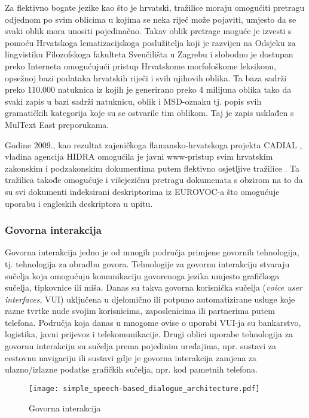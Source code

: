 \begin{multicols}{2}
Za flektivno bogate jezike kao što je hrvatski, tražilice moraju omogućiti pretragu odjednom po svim oblicima u kojima se neka riječ može pojaviti, umjesto da se svaki oblik mora unositi pojedinačno. Takav oblik pretrage moguće je izvesti s pomoću Hrvatskoga lematizacijskoga poslužitelja koji je razvijen na Odsjeku za lingvistiku Filozofskoga fakulteta Sveučilišta u Zagrebu i slobodno je dostupan preko Interneta \cite{str16} omogućujući pristup Hrvatskome morfološkome leksikonu, opsežnoj bazi podataka hrvatskih riječi i svih njihovih oblika. Ta baza sadrži preko 110.000 natuknica iz kojih je generirano preko 4 milijuna oblika tako da svaki zapis u bazi sadrži natuknicu, oblik i MSD-oznaku tj. popis svih gramatičkih kategorija koje su se ostvarile tim oblikom. Taj je zapis usklađen s MulText East \cite{str17} preporukama.

Godine 2009., kao rezultat zajeničkoga flamansko-hrvatskoga projekta CADIAL \cite{str18}, vladina agencija HIDRA omogućila je javni www-pristup svim hrvatskim zakonskim i podzakonskim dokumentima putem flektivno osjetljive tražilice \cite{str19}. Ta tražilica takođe omogućuje i višejezičnu pretragu dokumenata s obzirom na to da su svi dokumenti indeksirani deskriptorima iz EUROVOC-a što omogućuje uporabu i engleskih deskriptora u upitu.

  
\subsubsection{Govorna interakcija}

Govorna interakcija jedno je od mnogih područja primjene govornih tehnologija, tj. tehnologija za obradbu govora. Tehnologije za govornu interakciju stvaraju sučelja koja omogućuju komunikaciju govorenoga jezika umjesto grafičkoga sučelja, tipkovnice ili miša. Danas su takva govorna korisnička sučelja (\emph{voice user interfaces}, VUI) uključena u djelomično ili potpuno automatizirane usluge koje razne tvrtke nude svojim korisnicima, zaposlenicima ili partnerima putem telefona. Područja koja danas u mnogome ovise o uporabi VUI-ja su bankarstvo, logistika, javni prijevoz i telekomunikacije. Drugi oblici uporabe tehnologija za govornu interakciju su sučelja prema pojedinim uređajima, npr. sustavi za cestovnu navigaciju ili sustavi gdje je govorna interakcija zamjena za ulazno/izlazne podatke grafičkih sučelja, npr. kod pametnih telefona.

\begin{figure*}[htb]
  \center 
  \texttt{[image: simple\_speech-based\_dialogue\_architecture.pdf]}
  \caption{Govorna interakcija}
  \label{fig:dialoguearch_cro}
\end{figure*}


\end{multicols}
